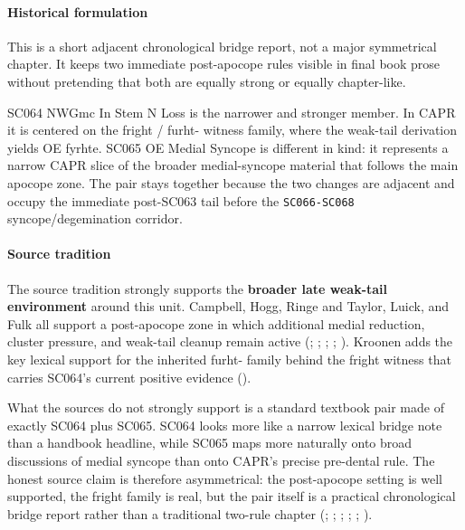 \documentclass[
  british,
  a4paper,
]{article}
\begin{document}
\paragraph{Historical formulation}\label{historical-formulation-41}

This is a short adjacent chronological bridge report, not a major
symmetrical chapter. It keeps two immediate post-apocope rules visible
in final book prose without pretending that both are equally strong or
equally chapter-like.

SC064 NWGmc In Stem N Loss is the narrower and stronger member. In CAPR
it is centered on the fright / furht- witness family, where the
weak-tail derivation yields OE fyrhte. SC065 OE Medial Syncope is
different in kind: it represents a narrow CAPR slice of the broader
medial-syncope material that follows the main apocope zone. The pair
stays together because the two changes are adjacent and occupy the
immediate post-SC063 tail before the \texttt{SC066-SC068}
syncope/degemination corridor.

\paragraph{Source tradition}\label{source-tradition-41}

The source tradition strongly supports the \textbf{broader late
weak-tail environment} around this unit. Campbell, Hogg, Ringe and
Taylor, Luick, and Fulk all support a post-apocope zone in which
additional medial reduction, cluster pressure, and weak-tail cleanup
remain active (; ;
; ; ). Kroonen adds
the key lexical support for the inherited furht- family behind the
fright witness that carries SC064's current positive evidence
().

What the sources do not strongly support is a standard textbook pair
made of exactly SC064 plus SC065. SC064 looks more like a narrow lexical
bridge note than a handbook headline, while SC065 maps more naturally
onto broad discussions of medial syncope than onto CAPR's precise
pre-dental rule. The honest source claim is therefore asymmetrical: the
post-apocope setting is well supported, the fright family is real, but
the pair itself is a practical chronological bridge report rather than a
traditional two-rule chapter (; ;
; ; ;
).
\end{document}

